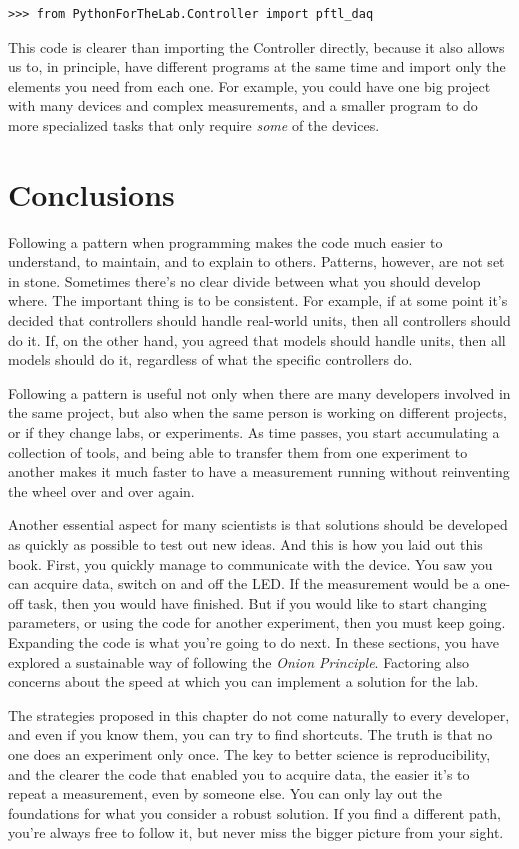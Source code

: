 \begin{verbatim}
>>> from PythonForTheLab.Controller import pftl_daq
\end{verbatim}

This code is clearer than importing the Controller directly, because it also allows us to, in principle, have different programs at the same time and import only the elements you need from each one. For example, you could have one big project with many devices and complex measurements, and a smaller program to do more specialized tasks that only require \emph{some} of the devices.

\section{Conclusions}\label{sec:layout-conclusions}
Following a pattern when programming makes the code much easier to understand, to maintain, and to explain to others. Patterns, however, are not set in stone. Sometimes there's no clear divide between what you should develop where. The important thing is to be consistent. For example, if at some point it's decided that controllers should handle real-world units, then all controllers should do it. If, on the other hand, you agreed that models should handle units, then all models should do it, regardless of what the specific controllers do.

Following a pattern is useful not only when there are many developers involved in the same project, but also when the same person is working on different projects, or if they change labs, or experiments. As time passes, you start accumulating a collection of tools, and being able to transfer them from one experiment to another makes it much faster to have a measurement running without reinventing the wheel over and over again.

Another essential aspect for many scientists is that solutions should be developed as quickly as possible to test out new ideas. And this is how you laid out this book. First, you quickly manage to communicate with the device. You saw you can acquire data, switch on and off the LED. If the measurement would be a one-off task, then you would have finished. But if you would like to start changing parameters, or using the code for another experiment, then you must keep going. Expanding the code is what you're going to do next. In these sections, you have explored a sustainable way of following the \emph{Onion Principle}. Factoring also concerns about the speed at which you can implement a solution for the lab.

The strategies proposed in this chapter do not come naturally to every developer, and even if you know them, you can try to find shortcuts. The truth is that no one does an experiment only once. The key to better science is reproducibility, and the clearer the code that enabled you to acquire data, the easier it's to repeat a measurement, even by someone else. You can only lay out the foundations for what you consider a robust solution. If you find a different path, you're always free to follow it, but never miss the bigger picture from your sight.
